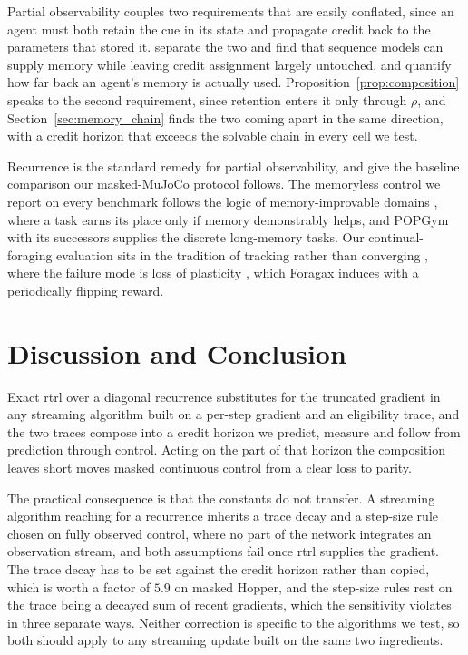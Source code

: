 \documentclass{article}
\begin{document}
Partial observability couples two requirements that are easily conflated, since an agent must
both retain the cue in its state and propagate credit back to the parameters that stored it.
\citet{ni2023transformers} separate the two and find that sequence models can supply memory while
leaving credit assignment largely untouched, and \citet{lafuente2025temporal} quantify how far
back an agent's memory is actually used. Proposition~\ref{prop:composition} speaks to the second
requirement, since retention enters it only through $\rho$, and
Section~\ref{sec:memory_chain} finds the two coming apart in the same direction, with a credit
horizon that exceeds the solvable chain in every cell we test.

Recurrence is the standard remedy for partial observability, and \citet{ni2022recurrent} give
the baseline comparison our masked-MuJoCo protocol follows. The memoryless control we report on
every benchmark follows the logic of memory-improvable domains \citep{tao2025pobax}, where a task
earns its place only if memory demonstrably helps, and POPGym \citep{morad2023popgym} with its
successors \citep{wang2026popgymarcade} supplies the discrete long-memory tasks. Our
continual-foraging evaluation sits in the tradition of tracking rather than converging
\citep{sutton2007tracking, khetarpal2022towards}, where the failure mode is loss of plasticity
\citep{dohare2024loss, abbas2023loss}, which Foragax \citep{tang2026forager} induces with a
periodically flipping reward.

\section{Discussion and Conclusion}
\label{sec:discussion}

Exact \gls{rtrl} over a diagonal recurrence substitutes for the truncated gradient in any
streaming algorithm built on a per-step gradient and an eligibility trace, and the two traces
compose into a credit horizon we predict, measure and follow from prediction through control.
Acting on the part of that horizon the composition leaves short moves masked
continuous control from a clear loss to parity.

The practical consequence is that the constants do not transfer. A streaming algorithm reaching
for a recurrence inherits a trace decay and a step-size rule chosen on fully observed control,
where no part of the network integrates an observation stream, and both assumptions fail once
\gls{rtrl} supplies the gradient. The trace decay has to be set against the credit horizon rather
than copied, which is worth a factor of $5.9$ on masked Hopper, and the step-size rules rest on
the trace being a decayed sum of recent gradients, which the sensitivity violates in three
separate ways. Neither correction is specific to the algorithms we test, so both should apply to
any streaming update built on the same two ingredients.
\end{document}
